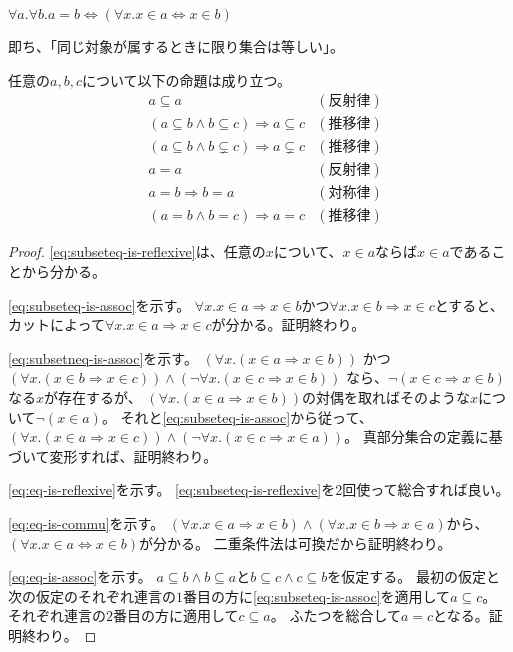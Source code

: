 \documentclass[uplatex,papersize,dvipdfmx]{jsarticle}
\begin{document}
    \begin{axiom}[外延性公理]
      $\forall a. \forall b. a = b \Leftrightarrow (\forall x. x \in a \Leftrightarrow x \in b)$
      \begin{note}
        即ち、「同じ対象が属するときに限り集合は等しい」。
      \end{note}
    \end{axiom}
    \begin{theorem}
      任意の$a, b, c$について以下の命題は成り立つ。
      \begin{align}
        &a \subseteq a &(反射律) \label{eq:subseteq-is-reflexive}\\
        &(a \subseteq b \land b \subseteq c) \Rightarrow a \subseteq c &(推移律) \label{eq:subseteq-is-assoc}\\
        &(a \subseteq b \land b \subsetneq c) \Rightarrow a \subsetneq c &(推移律) \label{eq:subsetneq-is-assoc}\\
        &a = a &(反射律) \label{eq:eq-is-reflexive}\\
        &a = b \Rightarrow b = a &(対称律)\label{eq:eq-is-commu}\\
        &(a = b \land b = c) \Rightarrow a = c &(推移律) \label{eq:eq-is-assoc}
      \end{align}
      \begin{proof}
        \eqref{eq:subseteq-is-reflexive}は、任意の$x$について、$x \in a$ならば$x \in a$であることから分かる。

        \eqref{eq:subseteq-is-assoc}を示す。
        $\forall x. x \in a \Rightarrow x \in b$かつ$\forall x. x \in b \Rightarrow x \in c$とすると、カットによって$\forall x. x \in a \Rightarrow x \in c$が分かる。証明終わり。

        \eqref{eq:subsetneq-is-assoc}を示す。
        $(\forall x. (x \in a \Rightarrow x \in b))$
        かつ$(\forall x. (x \in b \Rightarrow x \in c)) \land (\lnot \forall x.(x \in c \Rightarrow x \in b))$
        なら、$\lnot (x \in c \Rightarrow x \in b)$なる$x$が存在するが、
        $(\forall x. (x \in a \Rightarrow x \in b))$の対偶を取ればそのような$x$について$\lnot(x \in a)$。
        それと\eqref{eq:subseteq-is-assoc}から従って、
        $(\forall x. (x \in a \Rightarrow x \in c)) \land (\lnot \forall x.(x \in c \Rightarrow x \in a))$。
        真部分集合の定義に基づいて変形すれば、証明終わり。

        \eqref{eq:eq-is-reflexive}を示す。
        \eqref{eq:subseteq-is-reflexive}を2回使って総合すれば良い。

        \eqref{eq:eq-is-commu}を示す。
        $(\forall x. x \in a \Rightarrow x \in b) \land (\forall x. x \in b \Rightarrow x \in a)$から、
        $(\forall x. x \in a \Leftrightarrow x \in b)$が分かる。
        二重条件法は可換だから証明終わり。

        \eqref{eq:eq-is-assoc}を示す。
        $a \subseteq b \land b \subseteq a$と$b \subseteq c \land c \subseteq b$を仮定する。
        最初の仮定と次の仮定のそれぞれ連言の$1$番目の方に\eqref{eq:subseteq-is-assoc}を適用して$a \subseteq c$。
        それぞれ連言の$2$番目の方に適用して$c \subseteq a$。
        ふたつを総合して$a = c$となる。証明終わり。
      \end{proof}
    \end{theorem}
\end{document}
